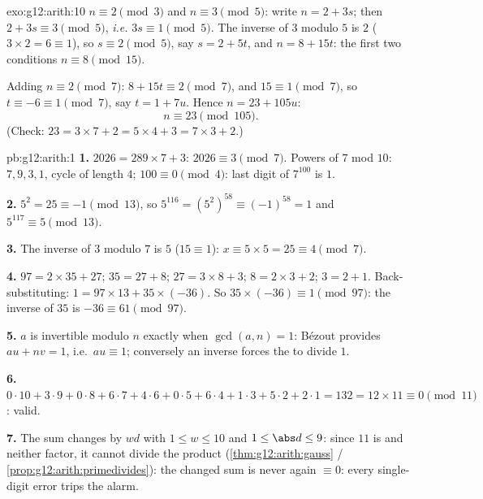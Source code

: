 \begin{solution}{exo:g12:arith:10}
$n \equiv 2 \pmod 3$ and $n \equiv 3 \pmod 5$: write $n = 2 + 3s$; then
$2 + 3s \equiv 3 \pmod 5$, \emph{i.e.} $3s \equiv 1 \pmod 5$. The inverse of
$3$ modulo $5$ is $2$ ($3\times2 = 6 \equiv 1$), so $s \equiv 2 \pmod 5$,
say $s = 2 + 5t$, and $n = 8 + 15t$: the first two conditions 
$n \equiv 8 \pmod{15}$.

Adding $n \equiv 2 \pmod 7$: $8 + 15t \equiv 2 \pmod 7$, and
$15 \equiv 1 \pmod 7$, so $t \equiv -6 \equiv 1 \pmod 7$, say
$t = 1 + 7u$. Hence $n = 23 + 105u$:
\[
n \equiv 23 \pmod{105}.
\]
(Check: $23 = 3\times7 + 2 = 5\times4 + 3 = 7\times3 + 2$.)
\end{solution}

\begin{solution}{pb:g12:arith:1}
\textbf{1.} $2026 = 289 \times 7 + 3$: $2026 \equiv 3
\pmod 7$. Powers of $7$ mod $10$: $7, 9, 3, 1$, cycle of
length $4$; $100 \equiv 0 \pmod 4$: last digit of
$7^{100}$ is $1$.

\textbf{2.} $5^2 = 25 \equiv -1 \pmod{13}$, so
$5^{116} = \left(5^2\right)^{58} \equiv (-1)^{58} = 1$ and
$5^{117} \equiv 5 \pmod{13}$.

\textbf{3.} The inverse of $3$ modulo $7$ is $5$
($15 \equiv 1$): $x \equiv 5 \times 5 = 25 \equiv 4 \pmod 7$.

\textbf{4.} $97 = 2 \times 35 + 27$; $35 = 27 + 8$;
$27 = 3 \times 8 + 3$; $8 = 2 \times 3 + 2$; $3 = 2 + 1$.
Back-substituting: $1 = 97 \times 13 + 35 \times (-36)$. So
$35 \times (-36) \equiv 1 \pmod{97}$: the inverse of $35$ is
$-36 \equiv 61 \pmod{97}$.

\textbf{5.} $a$ is invertible modulo $n$ exactly when
$\gcd(a, n) = 1$: B\'ezout provides $au + nv = 1$, i.e.\
$au \equiv 1$; conversely an inverse forces the  to divide
$1$.

\textbf{6.} $0{\cdot}10 + 3{\cdot}9 + 0{\cdot}8 + 6{\cdot}7 +
4{\cdot}6 + 0{\cdot}5 + 6{\cdot}4 + 1{\cdot}3 + 5{\cdot}2 +
2{\cdot}1 = 132 = 12 \times 11 \equiv 0 \pmod{11}$: valid.

\textbf{7.} The sum changes by $wd$ with
$1 \leq w \leq 10$ and $1 \leq \abs d \leq 9$: since $11$ is
 and  neither factor, it cannot divide the product
(\cref{thm:g12:arith:gauss} / \cref{prop:g12:arith:primedivides}):
the changed sum is never again $\equiv 0$: every single-digit
error trips the alarm.


\end{solution}
